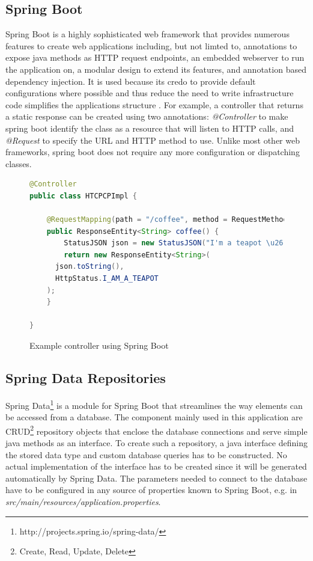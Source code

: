 \subsection{Spring Boot}
Spring Boot is a highly sophisticated web framework that provides numerous features to create web applications including, but not limted to, annotations to expose java methods as HTTP request endpoints, an embedded webserver to run the application on, a modular design to extend its features, and annotation based dependency injection. It is used because its credo to provide default configurations where possible and thus reduce the need to write infrastructure code simplifies the applications structure \cite[p. 6]{SpringGuide}.
For example, a controller that returns a static response can be created using two annotations:
\textit{@Controller} to make spring boot identify the class as a resource that will listen to HTTP calls, and \textit{@Request} to specify the URL and HTTP method to use. Unlike most other web frameworks, spring boot does not require any more configuration or dispatching classes.

\begin{figure}[h]
\begin{lstlisting}[language=Java]
@Controller
public class HTCPCPImpl {

	@RequestMapping(path = "/coffee", method = RequestMethod.GET)
	public ResponseEntity<String> coffee() {
		StatusJSON json = new StatusJSON("I'm a teapot \u2615");
		return new ResponseEntity<String>(
      json.toString(),
      HttpStatus.I_AM_A_TEAPOT
    );
	}

}
\end{lstlisting}
\caption[Example Controller]{Example controller using Spring Boot}
\end{figure}

\newpage
\subsection{Spring Data Repositories}
Spring Data\footnote{http://projects.spring.io/spring-data/} is a module for Spring Boot that streamlines the way elements can be accessed from a database.
The component mainly used in this application are CRUD\footnote{Create, Read, Update, Delete} repository objects that enclose the database connections and serve
simple java methods as an interface. To create such a repository, a java interface defining the stored data type and custom database queries has to be constructed.
No actual implementation of the interface has to be created since it will be generated automatically by Spring Data.
The parameters needed to connect to the database have to be configured in any source of properties known to Spring Boot, e.g. in \textit{src/main/resources/application.properties}.

